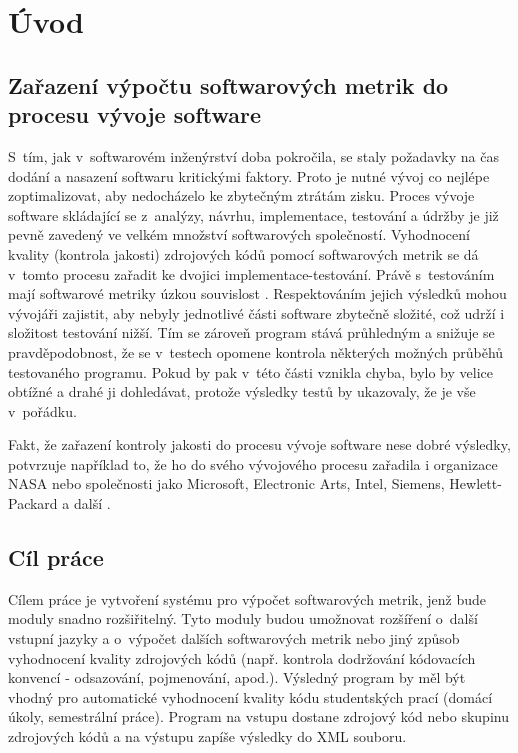 \documentclass[11pt,twoside,a4paper]{book}
\begin{document}

% 
% 

\chapter{Úvod}

\section{Zařazení výpočtu softwarových metrik do procesu vývoje software}
S~tím, jak v~softwarovém inženýrství doba pokročila, se staly požadavky na čas dodání a nasazení
softwaru kritickými faktory. Proto je nutné vývoj co nejlépe zoptimalizovat, aby nedocházelo ke zbytečným ztrátám zisku.
Proces vývoje software skládající se z~analýzy, návrhu, implementace, testování a údržby je již pevně zavedený ve velkém
množství softwarových společností. Vyhodnocení kvality (kontrola jakosti) zdrojových kódů pomocí softwarových metrik se dá
v~tomto procesu zařadit ke dvojici implementace-testování. Právě s~testováním mají softwarové metriky úzkou souvislost \cite{CCN,NPATH,MCCABEWHATSON96}.
Respektováním jejich výsledků mohou vývojáři zajistit, aby nebyly jednotlivé části software zbytečně složité,
což udrží i složitost testování nižší. Tím se zároveň program stává průhledným a snižuje se pravděpodobnost, že se v~testech
opomene kontrola některých možných průběhů testovaného programu. Pokud by pak v~této části vznikla chyba, bylo by velice obtížné
a drahé ji dohledávat, protože výsledky testů by ukazovaly, že je vše v~pořádku.

Fakt, že zařazení kontroly jakosti do procesu vývoje software nese dobré výsledky, potvrzuje například to, že ho do svého
vývojového procesu zařadila i organizace NASA\cite{NASA} nebo společnosti jako Microsoft, Electronic Arts, Intel, Siemens, Hewlett-Packard
a další \cite{NDepend}.

\section{Cíl práce}
\label{sec:Cil}
Cílem práce je vytvoření systému pro výpočet softwarových metrik, jenž bude moduly snadno rozšiřitelný.
Tyto moduly budou umožnovat rozšíření o~další vstupní jazyky a o~výpočet dalších softwarových metrik nebo jiný způsob vyhodnocení kvality
zdrojových kódů (např. kontrola dodržování kódovacích konvencí - odsazování, pojmenování, apod.).
Výsledný program by měl být vhodný pro automatické vyhodnocení kvality kódu studentských prací (domácí úkoly,
semestrální práce). Program na vstupu dostane zdrojový kód nebo skupinu zdrojových kódů a na výstupu
zapíše výsledky do XML souboru.
\end{document}
